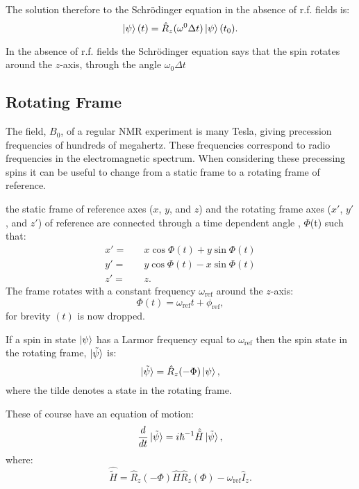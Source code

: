 The solution therefore to the Schr\"odinger equation in the absence of r.f. fields is:
\begin{equation}
  \ket{\psi}(t) = \hat{R}_z(\omega^0\Delta{t})\ket{\psi}(t_0).
\end{equation}

In the absence of r.f. fields the Schr\"odinger equation says that the spin rotates
around the $z$-axis, through the angle $\omega_0\Delta{t}$

\subsection{Rotating Frame}

The field, $B_0$, of a regular NMR experiment is many Tesla, giving precession
frequencies of hundreds of megahertz. These frequencies correspond to radio frequencies
in the electromagnetic spectrum. When considering these precessing spins
it can be useful to change from a static frame to a rotating frame of reference.

the static frame of reference axes ($x$, $y$, and $z$) and the rotating frame axes ($x'$, $y'$, and $z'$) of reference are connected through
a time dependent angle , $\Phi$(t) such that:
\begin{align}
  x' =&\quad x\cos\Phi(t) + y\sin\Phi(t)\\
  y' =&\quad y\cos\Phi(t) - x\sin\Phi(t)\\
  z' =&\quad z.
\end{align}
The frame rotates with a constant frequency $\omega_\text{ref}$ around the $z$-axis:
\begin{equation}
  \Phi(t) = \omega_{\text{ref}}t + \phi_{\text{ref}},
\end{equation}
for brevity $(t)$ is now dropped.

If a spin in state $\ket{\psi}$ has a Larmor frequency equal to $\omega_\text{ref}$
then the spin state in the rotating frame, $\ket{\tilde{\psi}}$ is:
\begin{equation}
  \ket{\tilde{\psi}} = \hat{R}_z(-\Phi)\ket{\psi},
\end{equation}
where the tilde denotes a state in the rotating frame.

These of course have an equation of motion:
\begin{equation}
  \frac{d}{dt}\ket{\tilde{\psi}} = i\hbar^{-1}\hat{\tilde{H}}\ket{\tilde{\psi}},
\end{equation}
where:
\begin{equation}\label{eqn:RotFrame}
  \hat{\tilde{H}} = \hat{R}_z(-\Phi)\hat{H}\hat{R}_z(\Phi) - \omega_\text{ref}\hat{I}_z.
\end{equation}

